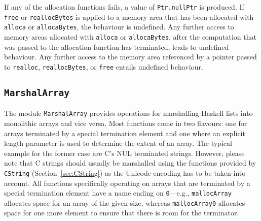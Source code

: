 \documentclass[a4paper,twoside]{article}
\newcommand{\code}[1]{\texttt{#1}}      %
\begin{document}
%
If any of the allocation functions fails, a value of \code{Ptr.nullPtr} is
produced.  If \code{free} or \code{reallocBytes} is applied to a memory area
that has been allocated with \code{alloca} or \code{allocaBytes}, the
behaviour is undefined.  Any further access to memory areas allocated with
\code{alloca} or \code{allocaBytes}, after the computation that was passed to
the allocation function has terminated, leads to undefined behaviour.  Any
further access to the memory area referenced by a pointer passed to
\code{realloc}, \code{reallocBytes}, or \code{free} entails undefined
behaviour.

\subsection{\code{MarshalArray}}
\label{sec:MarshalArray}

The module \code{MarshalArray} provides operations for marshalling Haskell
lists into monolithic arrays and vice versa.  Most functions come in two
flavours: one for arrays terminated by a special termination element and one
where an explicit length parameter is used to determine the extent of an
array.  The typical example for the former case are C's NUL terminated
strings.  However, please note that C strings should usually be marshalled
using the functions provided by \code{CString} (Section~\ref{sec:CString}) as
the Unicode encoding has to be taken into account.  All functions specifically
operating on arrays that are terminated by a special termination element have
a name ending on \code{0}---e.g., \code{mallocArray} allocates space for an
array of the given size, whereas \code{mallocArray0} allocates space for one
more element to ensure that there is room for the terminator.
\end{document}
